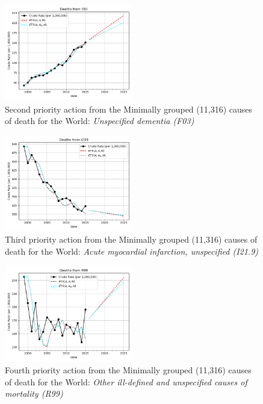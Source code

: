 \documentclass[10pt, a4paper, twocolumn]{IEEEconf}
\begin{document}
\begin{figure}[H]
  \centering
  \includegraphics[width=0.5\textwidth]{results/WORLD_ICD10_MINIMALLY_GROUPED/F03_ets.png}
  \caption{Second priority action from the Minimally grouped (11,316) causes of death for the World: \textit{Unspecified dementia (F03)}}\label{fig:k8b}
\end{figure}

\begin{figure}[H]
  \centering
  \includegraphics[width=0.5\textwidth]{results/WORLD_ICD10_MINIMALLY_GROUPED/I219_ets.png}
  \caption{Third priority action from the Minimally grouped (11,316) causes of death for the World: \textit{Acute myocardial infarction, unspecified (I21.9)}}\label{fig:k8c}
\end{figure}

\begin{figure}[H]
  \centering
  \includegraphics[width=0.5\textwidth]{results/WORLD_ICD10_MINIMALLY_GROUPED/R99_ets.png}
  \caption{Fourth priority action from the Minimally grouped (11,316) causes of death for the World: \textit{Other ill-defined and unspecified causes of mortality (R99)}}\label{fig:k8d}
\end{figure}
\end{document}
